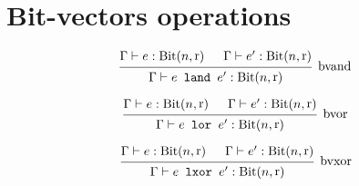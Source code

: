 \documentclass[english, 12pt]{article}
\DeclareMathOperator{\Bit}{Bit}
\DeclareMathOperator{\Raw}{r}
\begin{document}
\section{Bit-vectors operations}

\[
    \begin{prooftree}
        \hypo{\Gamma \vdash e : \Bit(n, \Raw)}
        \hypo{\Gamma \vdash e' : \Bit(n, \Raw)}
        \infer2[bvand]{\Gamma \vdash e \texttt{ land } e' : \Bit(n, \Raw)}
    \end{prooftree}
\]

\[
    \begin{prooftree}
        \hypo{\Gamma \vdash e : \Bit(n, \Raw)}
        \hypo{\Gamma \vdash e' : \Bit(n, \Raw)}
        \infer2[bvor]{\Gamma \vdash e \texttt{ lor } e' : \Bit(n, \Raw)}
    \end{prooftree}
\]

\[
    \begin{prooftree}
        \hypo{\Gamma \vdash e : \Bit(n, \Raw)}
        \hypo{\Gamma \vdash e' : \Bit(n, \Raw)}
        \infer2[bvxor]{\Gamma \vdash e \texttt{ lxor } e' : \Bit(n, \Raw)}
    \end{prooftree}
\]
\end{document}
